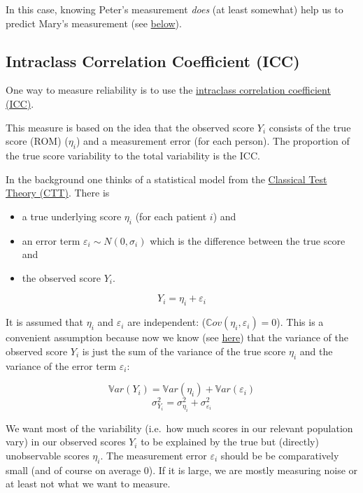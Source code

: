 \documentclass[
]{book}
\providecommand{\tightlist}{%
  \setlength{\itemsep}{0pt}\setlength{\parskip}{0pt}}
\begin{document}
In this case, knowing Peter's measurement \emph{does} (at least somewhat) help us to predict
Mary's measurement (see \hyperref[badnews]{below}).

\subsection{Intraclass Correlation Coefficient (ICC)}\label{ICC}

One way to measure reliability is to use the
\href{https://en.wikipedia.org/wiki/Intraclass_correlation}{intraclass correlation coefficient (ICC)}.

This measure is based on the idea that the observed score \(Y_i\) consists of the true score
(ROM) (\(\eta_i\)) and a measurement error (for each person).
The proportion of the true score variability to the total variability is the ICC.

In the background one thinks of a statistical model from the
\href{https://en.wikipedia.org/wiki/Classical_test_theory}{Classical Test Theory (CTT)}.
There is

\begin{itemize}
\tightlist
\item
  a true underlying score \(\eta_i\) (for each patient \(i\)) and
\item
  an error term \(\varepsilon_i \sim N(0, \sigma_i)\) which is the difference between the true
  score and
\item
  the observed score \(Y_i\).
\end{itemize}

\[Y_i = \eta_i + \varepsilon_i\]

It is assumed that \(\eta_i\) and \(\varepsilon_i\) are independent: (\(\mathbb{C}ov(\eta_i, \varepsilon_i)=0\)).
This is a convenient assumption because now we know (see \href{https://en.wikipedia.org/wiki/Variance\#Addition_and_multiplication_by_a_constant}{here})
that the variance
of the observed score \(Y_i\) is just the sum of the variance of the true score \(\eta_i\)
and the variance of the error term \(\varepsilon_i\):

\[\mathbb{V}ar(Y_i) = \mathbb{V}ar(\eta_i) + \mathbb{V}ar(\varepsilon_i)\]
\[\sigma_{Y_i}^2 = \sigma_{\eta_i}^2 + \sigma_{\varepsilon_i}^2\]

We want most of the variability (i.e.~how much scores in our relevant population vary)
in our observed scores \(Y_i\) to be explained by the
true but (directly) unobservable scores \(\eta_i\). The measurement error \(\varepsilon_i\) should be
be comparatively small (and of course on average \(0\)). If it is large, we are mostly measuring noise or at least not
what we want to measure.
\end{document}
